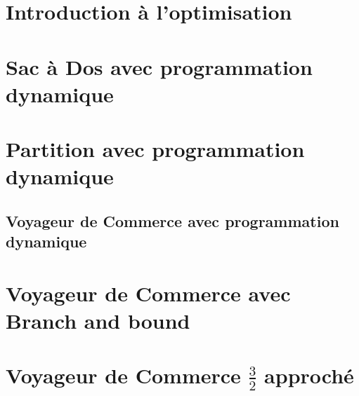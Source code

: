 \section{Introduction à l'optimisation}

\clearpage

\section{Sac à Dos avec programmation dynamique}

\clearpage

\section{Partition avec programmation dynamique}

\clearpage

\subsection{Voyageur de Commerce avec programmation dynamique}

\clearpage


\section{Voyageur de Commerce avec Branch and bound}

\clearpage


\section{Voyageur de Commerce $\frac{3}{2}$ approché}

\pagebreak